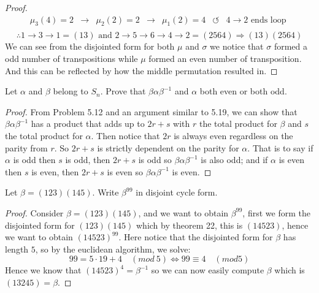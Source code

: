 \begin{assignment}[
  header=HeaderA,
  body=BodyA,
  title={Homework 3},
  duedate={26 February, 2026},
  toc=false,
  toctitle={This appears on the Table of contents.},
  exlist=false
]
\begin{exer}[Problem 5.10]
\begin{proof}
\[\begin{array}{lclclcl}
    \mu_3(4) = 2 & \rightarrow & \mu_2(2) = 2 & \rightarrow & \mu_1(2) = 4 & \circlearrowleft & 4 \to 2  \text{ ends loop }\\
\end{array}
 \]
 \[
 \therefore  1 \to 3 \to 1 = (13) \text{ and } 2 \to 5 \to 6\to 4 \to 2 = (2564) \Rightarrow (13)(2564)
 \]
 We can see from the disjointed form for both $\mu$ and $\sigma$ we notice that $\sigma$ formed a odd number of transpositions while $\mu$ formed an even number of transposition. And this can be reflected by how the middle permutation resulted in. 
\end{proof}
\end{exer}

\begin{exer}[Problem 5.20]
Let $\alpha$ and $\beta$ belong to $S_n$. Prove that $\beta\alpha\beta^{-1}$ and $\alpha$ both even or both odd.    
\begin{proof}
From Problem 5.12 and an argument similar to 5.19, we can show that $\beta\alpha\beta^{-1}$ has a product that adds up to $2r + s$ with $r$ the total product for $\beta$ and $s$ the total product for $\alpha$. Then notice that $2r$ is always even regardless on the parity from $r$. So $2r+s$ is strictly dependent on the parity for $\alpha$. That is to say if $\alpha$ is odd then $s$ is odd, then $2r+s$ is odd so $\beta\alpha\beta^{-1}$ is also odd; and if $\alpha$ is even then $s$ is even, then $2r + s$ is even so $\beta\alpha\beta^{-1}$ is even.      
\end{proof}
\end{exer}

\begin{exer}[Problem 5.40]
Let $\beta = (123)(145)$. Write $\beta^{99}$ in disjoint cycle form.  
\begin{proof}
Consider $\beta = (123)(145)$, and we want to obtain $\beta^{99}$, first we form the disjointed form for $(123)(145)$  which by theorem 22, this is $(14523)$, hence we want to obtain $(14523)^{99}$. Here notice that the disjointed form for $\beta$ has length $5$, so by the euclidean algorithm, we solve: $$99 = 5\cdot 19 + 4 \quad (mod\ 5) \iff 99 \equiv 4 \quad (mod 5)$$
Hence we know that $(14523)^4 = \beta^{-1}$ so we can now easily compute $\beta$ which is $(13245) = \beta$.
\end{proof}
\end{exer}


\end{assignment}